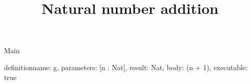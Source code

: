 \begin{lexlean}{Main}
\title{Natural number addition}
\begin{semanticmodule}
definition{name: g, parameters: [n : Nat], result: Nat, body: (n + 1), executable: true}
\end{semanticmodule}
\end{lexlean}
